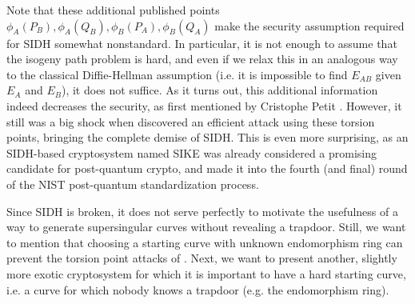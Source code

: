 Note that these additional published points $\phi_A(P_B), \phi_A(Q_B), \phi_B(P_A), \phi_B(Q_A)$ make the security assumption required for SIDH somewhat nonstandard.
In particular, it is not enough to assume that the isogeny path problem is hard, and even if we relax this in an analogous way to the classical Diffie-Hellman assumption (i.e. it is impossible to find $E_{AB}$ given $E_A$ and $E_B$), it does not suffice.
As it turns out, this additional information indeed decreases the security, as first mentioned by Cristophe Petit \cite{torsion_point_attack}.
However, it still was a big shock when \cite{sidh_broken} discovered an efficient attack using these torsion points, bringing the complete demise of SIDH.
This is even more surprising, as an SIDH-based cryptosystem named SIKE \cite{sike} was already considered a promising candidate for post-quantum crypto, and made it into the fourth (and final) round of the NIST post-quantum standardization process.

Since SIDH is broken, it does not serve perfectly to motivate the usefulness of a way to generate supersingular curves without revealing a trapdoor.
Still, we want to mention that choosing a starting curve with unknown endomorphism ring can prevent the torsion point attacks of \cite{torsion_point_attack}.
Next, we want to present another, slightly more exotic cryptosystem for which it is important to have a hard starting curve, i.e. a curve for which nobody knows a trapdoor (e.g. the endomorphism ring).

